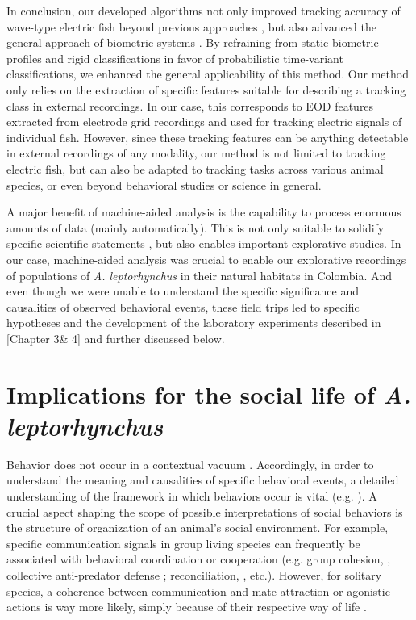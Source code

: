 \documentclass[11pt,pdftex]{article}
\newcommand{\note}[2][]{\textcolor{red!80!black}{[\textbf{\ifthenelse{\equal{#1}{}}{}{#1: }}#2]}}
\newcommand{\notetr}[1]{\note[TR]{#1}}
\newcommand{\lepto}{\textit{A. leptorhynchus}}
\begin{document}
In conclusion, our developed algorithms not only improved tracking accuracy of wave-type electric fish beyond previous approaches \citep{Madhav2018, Henninger2020}, but also advanced the general approach of biometric systems \citep{Kuhl2013}. By refraining from static biometric profiles and rigid classifications in favor of probabilistic time-variant classifications, we enhanced the general applicability of this method. Our method only relies on the extraction of specific features suitable for describing a tracking class in external recordings. In our case, this corresponds to EOD features extracted from electrode grid recordings and used for tracking electric signals of individual fish. However, since these tracking features can be anything detectable in external recordings of any modality, our method is not limited to tracking electric fish, but can also be adapted to tracking tasks across various animal species, or even beyond behavioral studies or science in general. 

A major benefit of machine-aided analysis is the capability to process enormous amounts of data (mainly automatically). This is not only suitable to solidify specific scientific statements \citep{Gomez2014, Dell2014}, but also enables important explorative studies. In our case, machine-aided analysis was crucial to enable our explorative recordings of populations of \lepto{} in their natural habitats in Colombia. And even though we were unable to understand the specific significance and causalities of observed behavioral events, these field trips led to specific hypotheses and the development of the laboratory experiments described in \notetr{Chapter 3\& 4} and further discussed below. 

\section{Implications for the social life of \lepto{}}

Behavior does not occur in a contextual vacuum \citep{Rendall1999, Seyfarth2017, Henninger2018}. Accordingly, in order to understand the meaning and causalities of specific behavioral events, a detailed understanding of the framework in which behaviors occur is vital (e.g. \citealp{Rendall1999, Henninger2018}). A crucial aspect shaping the scope of possible interpretations of social behaviors is the structure of organization of an animal's social environment. For example, specific communication signals in group living species can frequently be associated with behavioral coordination or cooperation (e.g. group cohesion, \citealp{Demartsev2018}, collective anti-predator defense \citealp{Schibler2007}; reconciliation, \citealp{Cheney1995}, etc.). However, for solitary species, a coherence between communication and mate attraction or agonistic actions is way more likely, simply because of their respective way of life \citep{Cornhill2020}. 
\end{document}
